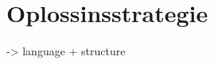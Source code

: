 
\chapter{Oplossinsstrategie}
\label{chapter:oplossingsstrategie}

\TODO

\TODO \citep{matthys2012component} -> language + structure
